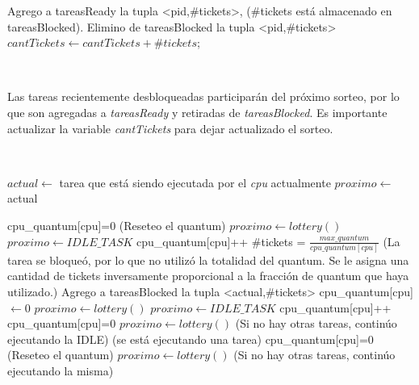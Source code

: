 \begin{algorithmic}
      \State Agrego a tareasReady la tupla <pid,\#tickets>, (\#tickets está almacenado en tareasBlocked).
      \State Elimino de tareasBlocked la tupla <pid,\#tickets>
      \State $cantTickets \gets cantTickets+\#tickets$;
  \EndFunction
\end{algorithmic}

~

Las tareas recientemente desbloqueadas participarán del próximo sorteo, por lo que son agregadas a \emph{tareasReady} y retiradas de \emph{tareasBlocked}.
Es importante actualizar la variable \emph{cantTickets} para dejar actualizado el sorteo.

~

\begin{algorithmic}
      \State $actual \gets$ tarea que está siendo ejecutada por el \emph{cpu} actualmente
      \State $proximo \gets$ actual
      
	  \State cpu\_quantum[cpu]=0 (Reseteo el quantum)
	      \State $proximo \gets lottery()$
	  \Else
	      \State $proximo \gets IDLE\_TASK$
	  \EndIf
      \EndIf
      \State
	  \State cpu\_quantum[cpu]++ 
	  \State \#tickets = $\frac{max\_quantum}{cpu\_quantum[cpu]}$ 
	  \State
	  \State (La tarea se bloqueó, por lo que no utilizó la totalidad del quantum.
	  \State Se le asigna una cantidad de tickets inversamente proporcional 
	  \State a la fracción de quantum que haya utilizado.)
	  \State
	  \State Agrego a tareasBlocked la tupla <actual,\#tickets>
	  \State cpu\_quantum[cpu] $\gets 0$
	      \State $proximo \gets lottery()$
	  \Else
	      \State $proximo \gets IDLE\_TASK$
	  \EndIf
      \EndIf
      \State
	  \State cpu\_quantum[cpu]++
		  \State cpu\_quantum[cpu]=0 
		  \State $proximo \gets lottery()$
	      \EndIf
	      \State(Si no hay otras tareas, continúo ejecutando la IDLE)
	  \Else(se está ejecutando una tarea)
		      \State cpu\_quantum[cpu]=0 (Reseteo el quantum)
		      \State $proximo \gets lottery()$
		  \EndIf
		  \State(Si no hay otras tareas, continúo ejecutando la misma)
	      \EndIf
	   \EndIf
      \EndIf
  \EndFunction
\end{algorithmic}

~

